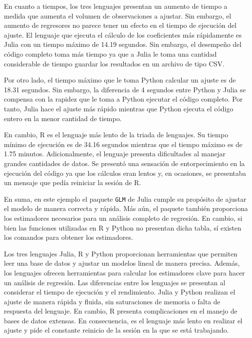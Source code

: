 En cuanto a tiempos, los tres lenguajes presentan un aumento de tiempo a medida que aumenta el volumen de observaciones a ajustar. Sin embargo, el aumento de regresores no parece tener un efecto en el tiempo de ejecución del ajuste. El lenguaje que ejecuta el cálculo de los coeficientes más rápidamente es \textsf{Julia} con un tiempo máximo de 14.19 segundos. Sin embargo, el desempeño del código completo toma más tiempo ya que a \textsf{Julia} le toma una cantidad considerable de tiempo guardar los resultados en un archivo de tipo \textsf{CSV}. 

Por otro lado, el tiempo máximo que le toma \textsf{Python} calcular un ajuste es de 18.31 segundos. Sin embargo, la diferencia de 4 segundos entre \textsf{Python} y \textsf{Julia} se compensa con la rapidez que le toma a \textsf{Python} ejecutar el código completo. Por tanto, \textsf{Julia} hace el ajuste más rápido mientras que \textsf{Python} ejecuta el código entero en la menor cantidad de tiempo. 

En cambio, \textsf{R} es el lenguaje más lento de la triada de lenguajes. Su tiempo mínimo de ejecución es de 34.16 segundos mientras que el tiempo máximo es de 1.75 minutos. Adicionalmente, el lenguaje presenta dificultades al manejar grandes cantidades de datos. Se presentó una sensación de entorpecimiento en la ejecución del código ya que los cálculos eran lentos y, en ocasiones, se presentaba un mensaje que pedía reiniciar la sesión de \textsf{R}.   

En suma, en este ejemplo el paquete \texttt{GLM} de \textsf{Julia} cumple su propósito de ajustar el modelo de manera correcta y rápida. Más aún, el paquete también proporciona los estimadores necesarios para un análisis completo de regresión. En cambio, si bien las funciones utilizadas en \textsf{R} y \textsf{Python} no presentan dicha tabla, sí existen los comandos para obtener los estimadores. 

Los tres lenguajes \textsf{Julia, R} y \textsf{Python} proporcionan herramientas que permiten leer una base de datos y ajustar un modelos lineal de manera precisa. Además, los lenguajes ofrecen herramientas para calcular los estimadores clave para hacer un análisis de regresión. Las diferencias entre los lenguajes se presentan al considerar el tiempo de ejecución y el rendimiento. \textsf{Julia} y \textsf{Python} realizan el ajuste de manera rápida y fluida, sin saturaciones de memoria o falta de respuesta del lenguaje. En cambio, \textsf{R} presenta complicaciones en el manejo de bases de datos extensas. En consecuencia, es el lenguaje más lento en realizar el ajuste y pide el constante reinicio de la sesión en la que se está trabajando. 

